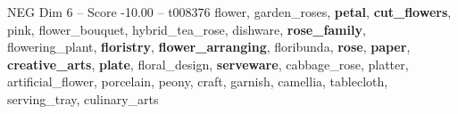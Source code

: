 \begin{textsample}{NEG Dim 6 – Score -10.00 – t008376}  \label{ex:f6_neg_015}
flower, garden\_roses, \textbf{petal}, \textbf{cut\_flowers}, pink, flower\_bouquet, hybrid\_tea\_rose, dishware, \textbf{rose\_family}, flowering\_plant, \textbf{floristry}, \textbf{flower\_arranging}, floribunda, \textbf{rose}, \textbf{paper}, \textbf{creative\_arts}, \textbf{plate}, floral\_design, \textbf{serveware}, cabbage\_rose, platter, artificial\_flower, porcelain, peony, craft, garnish, camellia, tablecloth, serving\_tray, culinary\_arts

\end{textsample}
